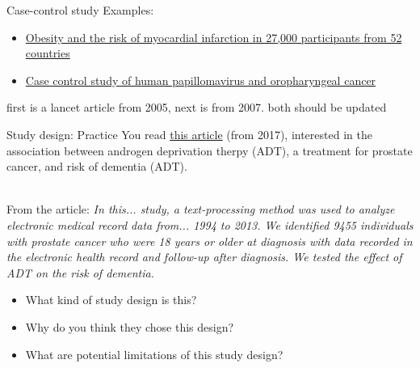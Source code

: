 \documentclass[10pt,t]{beamer}
\begin{document}
\begin{frame}[c]{Case-control study}
Examples:
\vspace{0.3cm}

\begin{itemize}
	\item \href{https://www.sciencedirect.com/science/article/pii/S0140673605676635}{\color{cyan}Obesity and the risk of myocardial infarction in 27,000 participants from 52 countries}
	\item \href{http://www.nejm.org/doi/full/10.1056/NEJMoa065497\#t=article}{\color{cyan}Case control study of human papillomavirus and oropharyngeal cancer}
\end{itemize}

\color{red} first is a lancet article from 2005, next is from 2007. both should be updated

\end{frame}

\begin{frame}{Study design: Practice}
You read \href{https://jamanetwork.com/journals/jamaoncology/fullarticle/2569059?resultClick=24}{\color{cyan} this article} (from 2017), interested in the association between androgen deprivation therpy (ADT), a treatment for prostate cancer, and risk of dementia (ADT). \\~\

From the article: \textit{In this... study, a text-processing method was used to analyze electronic medical record data from... 1994 to 2013. We identified 9455 individuals with prostate cancer who were 18 years or older at diagnosis with data recorded in the electronic health record and follow-up after diagnosis. We tested the effect of ADT on the risk of dementia.}

\vspace{0.3cm}

\begin{itemize}
	\item What kind of study design is this?
	\item Why do you think they chose this design? %
	\item What are potential limitations of this study design?
\end{itemize}
\end{frame}
\end{document}
